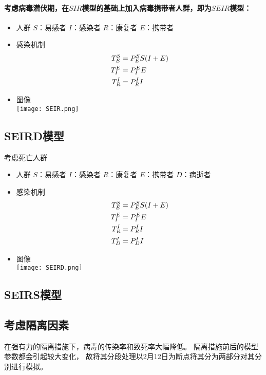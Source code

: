 \paragraph{考虑病毒潜伏期，在$SIR$模型的基础上加入病毒携带者人群，即为$SEIR$模型：}
\begin{itemize}
    \item 人群
          \subitem $S$：易感者
          \subitem $I$：感染者
          \subitem $R$：康复者
          \subitem $E$：携带者
    \item 感染机制
          \subitem
          \begin{align}
              T^{S}_{E}&=P^{S}_{E}S(I+E) \\
              T^{E}_{I}&=P^{E}_{I}E      \\
              T^{I}_{R}&=P^{I}_{R}I
          \end{align}
    \item 图像
          \\
          \texttt{[image: SEIR.png]}
\end{itemize}
\subsection{SEIRD模型}
考虑死亡人群
\begin{itemize}
    \item 人群
          \subitem $S$：易感者
          \subitem $I$：感染者
          \subitem $R$：康复者
          \subitem $E$：携带者
          \subitem $D$：病逝者
    \item 感染机制
          \subitem
          \begin{align}
              T^{S}_{E}&=P^{S}_{E}S(I+E) \\
              T^{E}_{I}&=P^{E}_{I}E      \\
              T^{I}_{R}&=P^{I}_{R}I      \\
              T^{I}_{D}&=P^{I}_{D}I
          \end{align}
    \item 图像
          \\
          \texttt{[image: SEIRD.png]}
          \par
\end{itemize}
\subsection{SEIRS模型}
\subsection{考虑隔离因素}
\par
在强有力的隔离措施下，病毒的传染率和致死率大幅降低。
隔离措施前后的模型参数都会引起较大变化，
故将其分段处理以2月12日为断点将其分为两部分对其分别进行模拟。
